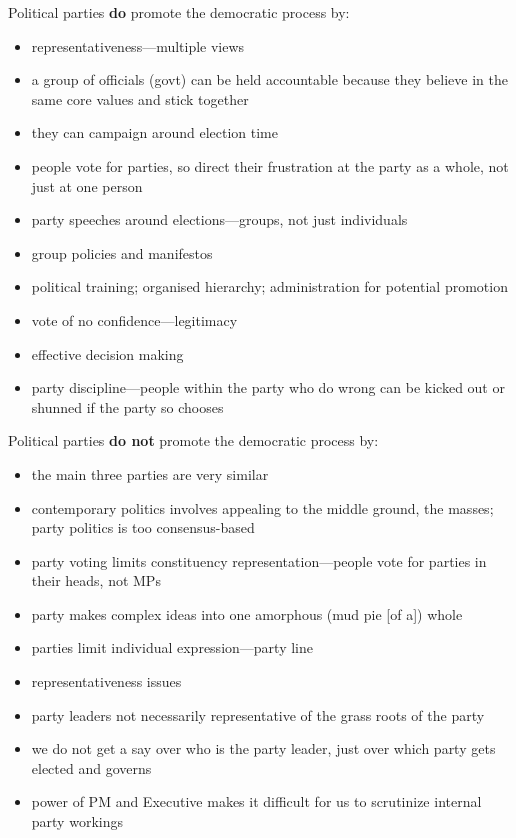 \documentclass[a4paper,12pt]{article}
\begin{document}
Political parties \textbf{do} promote the democratic process by:

\begin{itemize}
	\item{representativeness---multiple views}
	\item{a group of officials (govt) can be held accountable because they believe in the same core values and stick together}
	\item{they can campaign around election time}
	\item{people vote for parties, so direct their frustration at the party as a whole, not just at one person}
	\item{party speeches around elections---groups, not just individuals}
	\item{group policies and manifestos}
	\item{political training; organised hierarchy; administration for potential promotion}
	\item{vote of no confidence---legitimacy}
	\item{effective decision making}
	\item{party discipline---people within the party who do wrong can be kicked out or shunned if the party so chooses}
\end{itemize}

Political parties \textbf{do not} promote the democratic process by:

\begin{itemize}
	\item{the main three parties are very similar}
	\item{contemporary politics involves appealing to the middle ground, the masses; party politics is too consensus-based}
	\item{party voting limits constituency representation---people vote for parties in their heads, not MPs}
	\item{party makes complex ideas into one amorphous (mud pie [of a]) whole}
	\item{parties limit individual expression---party line}
	\item{representativeness issues}
	\item{party leaders not necessarily representative of the grass roots of the party}
	\item{we do not get a say over who is the party leader, just over which party gets elected and governs}
	\item{power of PM and Executive makes it difficult for us to scrutinize internal party workings}
\end{itemize}
\end{document}
